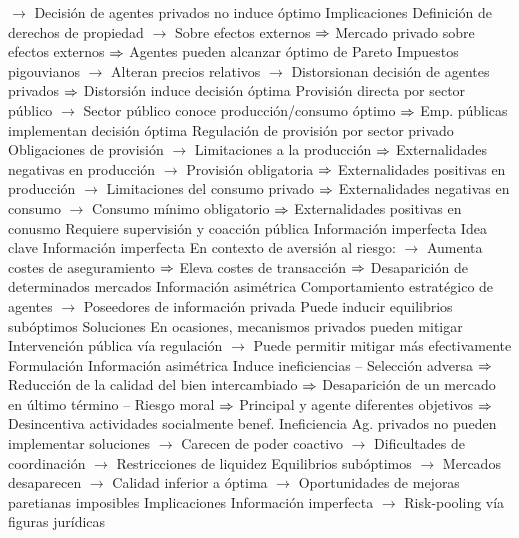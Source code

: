 \documentclass{nuevotema}
\begin{document}
\begin{esquemal}
				\4[] $\to$ Decisión de agentes privados no induce óptimo
			\3 Implicaciones
				\4 Definición de derechos de propiedad
				\4[] $\to$ Sobre efectos externos
				\4[] $\then$ Mercado privado sobre efectos externos
				\4[] $\then$ Agentes pueden alcanzar óptimo de Pareto
				\4 Impuestos pigouvianos
				\4[] $\to$ Alteran precios relativos
				\4[] $\to$ Distorsionan decisión de agentes privados
				\4[] $\then$ Distorsión induce decisión óptima
				\4 Provisión directa por sector público
				\4[] $\to$ Sector público conoce producción/consumo óptimo
				\4[] $\then$ Emp. públicas implementan decisión óptima
				\4 Regulación de provisión por sector privado
				\4[] Obligaciones de provisión
				\4[] $\to$ Limitaciones a la producción
				\4[] $\then$ Externalidades negativas en producción
				\4[] $\to$ Provisión obligatoria
				\4[] $\then$ Externalidades positivas en producción
				\4[] $\to$ Limitaciones del consumo privado
				\4[] $\then$ Externalidades negativas en consumo
				\4[] $\to$ Consumo mínimo obligatorio
				\4[] $\then$ Externalidades positivas en conusmo
				\4[$\then$] Requiere supervisión y coacción pública
		\2 Información imperfecta
			\3 Idea clave
				\4 Información imperfecta
				\4[] En contexto de aversión al riesgo:
				\4[] $\to$ Aumenta costes de aseguramiento
				\4[] $\then$ Eleva costes de transacción
				\4[] $\then$ Desaparición de determinados mercados
				\4 Información asimétrica
				\4[] Comportamiento estratégico de agentes
				\4[] $\to$ Poseedores de información privada
				\4[] Puede inducir equilibrios subóptimos
				\4 Soluciones
				\4[] En ocasiones, mecanismos privados pueden mitigar
				\4[] Intervención pública vía regulación
				\4[] $\to$ Puede permitir mitigar más efectivamente
			\3 Formulación
				\4 Información asimétrica
				\4[] Induce ineficiencias
				\4[] -- Selección adversa
				\4[] $\then$ Reducción de la calidad del bien intercambiado
				\4[] $\then$ Desaparición de un mercado en último término
				\4[] -- Riesgo moral
				\4[] $\then$ Principal y agente diferentes objetivos
				\4[] $\then$ Desincentiva actividades socialmente benef.
				\4 Ineficiencia
				\4[] Ag. privados no pueden implementar soluciones
				\4[] $\to$ Carecen de poder coactivo
				\4[] $\to$ Dificultades de coordinación
				\4[] $\to$ Restricciones de liquidez
				\4[] Equilibrios subóptimos
				\4[] $\to$ Mercados desaparecen
				\4[] $\to$ Calidad inferior a óptima
				\4[] $\to$ Oportunidades de mejoras paretianas imposibles
			\3 Implicaciones
				\4 Información imperfecta
				\4[] $\to$ Risk-pooling vía figuras jurídicas

\end{esquemal}
\end{document}
